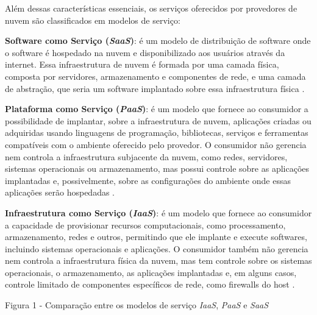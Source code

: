 Além dessas características essenciais, os serviços oferecidos por provedores de nuvem são classificados em modelos de serviço:

\textbf{Software como Serviço (\textit{SaaS})}: é um modelo de distribuição de software onde o software é hospedado na nuvem e disponibilizado aos usuários através da internet. Essa infraestrutura de nuvem é formada por uma camada física, composta por servidores, armazenamento e componentes de rede, e uma camada de abstração, que seria um software implantado sobre essa infraestrutura física \cite{mell2011}. 

\textbf{Plataforma como Serviço (\textit{PaaS})}: é um modelo que fornece ao consumidor a possibilidade de implantar, sobre a infraestrutura de nuvem, aplicações criadas ou adquiridas usando linguagens de programação, bibliotecas, serviços e ferramentas compatíveis com o ambiente oferecido pelo provedor. O consumidor não gerencia nem controla a infraestrutura subjacente da nuvem, como redes, servidores, sistemas operacionais ou armazenamento, mas possui controle sobre as aplicações implantadas e, possivelmente, sobre as configurações do ambiente onde essas aplicações serão hospedadas \cite{mell2011}.

\textbf{Infraestrutura como Serviço (\textit{IaaS})}: é um modelo que fornece ao consumidor a capacidade de provisionar recursos computacionais, como processamento, armazenamento, redes e outros, permitindo que ele implante e execute softwares, incluindo sistemas operacionais e aplicações. O consumidor também não gerencia nem controla a infraestrutura física da nuvem, mas tem controle sobre os sistemas operacionais, o armazenamento, as aplicações implantadas e, em alguns casos, controle limitado de componentes específicos de rede, como firewalls do host \cite{mell2011}.

Figura 1 - Comparação entre os modelos de serviço \textit{IaaS}, \textit{PaaS} e \textit{SaaS}

